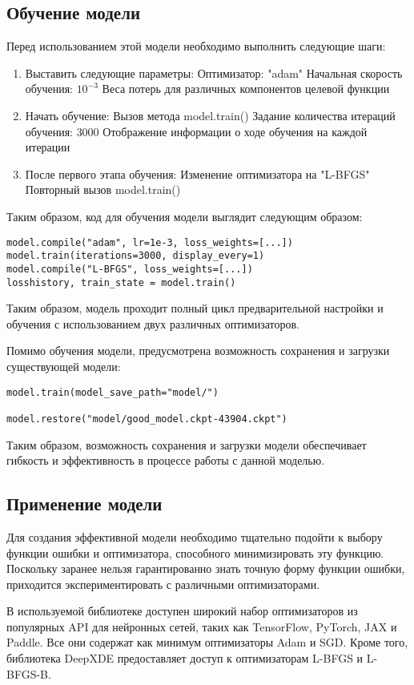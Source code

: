 \subsection{Обучение модели}
Перед использованием этой модели необходимо выполнить следующие шаги:
\begin{enumerate}
    \item Выставить следующие параметры:
    \subitem Оптимизатор: "adam"
    \subitem Начальная скорость обучения: $10^{-3}$
    \subitem Веса потерь для различных компонентов целевой функции
    \item Начать обучение:
    \subitem Вызов метода model.train()
    \subitem Задание количества итераций обучения: $3000$
    \subitem Отображение информации о ходе обучения на каждой итерации
    \item После первого этапа обучения:
    \subitem Изменение оптимизатора на "L-BFGS"
    \subitem Повторный вызов model.train()
\end{enumerate}
Таким образом, код для обучения модели выглядит следующим образом:
\begin{verbatim}
model.compile("adam", lr=1e-3, loss_weights=[...])
model.train(iterations=3000, display_every=1)
model.compile("L-BFGS", loss_weights=[...])
losshistory, train_state = model.train()
\end{verbatim}
Таким образом, модель проходит полный цикл предварительной настройки и обучения 
с использованием двух различных оптимизаторов.

Помимо обучения модели, предусмотрена возможность сохранения и загрузки существующей модели:
\begin{verbatim}
model.train(model_save_path="model/")

model.restore("model/good_model.ckpt-43904.ckpt")    
\end{verbatim}
Таким образом, возможность сохранения и загрузки модели обеспечивает гибкость и эффективность в процессе работы с данной моделью.
\subsection{Применение модели}
Для создания эффективной модели необходимо тщательно подойти к выбору функции ошибки и оптимизатора, способного минимизировать 
эту функцию. Поскольку заранее нельзя гарантированно знать точную форму функции ошибки, приходится экспериментировать с различными
оптимизаторами.

В используемой библиотеке доступен широкий набор оптимизаторов из популярных API для нейронных сетей, таких как TensorFlow, PyTorch,
JAX и Paddle. Все они содержат как минимум оптимизаторы Adam и SGD.
Кроме того, библиотека DeepXDE предоставляет доступ к оптимизаторам L-BFGS и L-BFGS-B.

